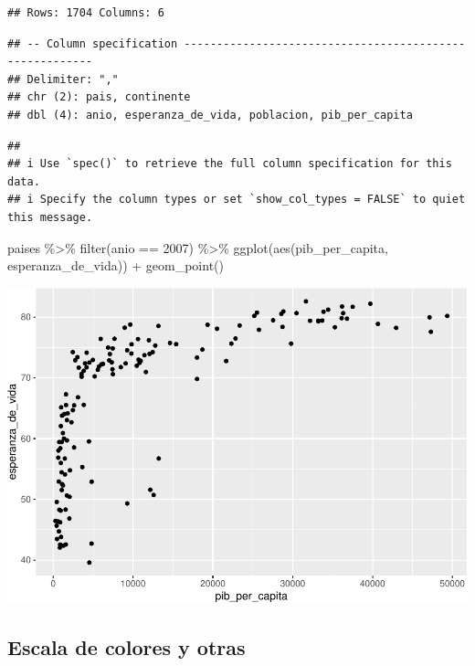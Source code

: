 \documentclass[
  openany]{book}
\newenvironment{Shaded}{\begin{snugshade}}{\end{snugshade}}
\newcommand{\DecValTok}[1]{\textcolor[rgb]{0.00,0.00,0.81}{#1}}
\newcommand{\FunctionTok}[1]{\textcolor[rgb]{0.00,0.00,0.00}{#1}}
\newcommand{\NormalTok}[1]{#1}
\newcommand{\SpecialCharTok}[1]{\textcolor[rgb]{0.00,0.00,0.00}{#1}}
\begin{document}
\begin{verbatim}
## Rows: 1704 Columns: 6
\end{verbatim}

\begin{verbatim}
## -- Column specification --------------------------------------------------------
## Delimiter: ","
## chr (2): pais, continente
## dbl (4): anio, esperanza_de_vida, poblacion, pib_per_capita
\end{verbatim}

\begin{verbatim}
## 
## i Use `spec()` to retrieve the full column specification for this data.
## i Specify the column types or set `show_col_types = FALSE` to quiet this message.
\end{verbatim}

\begin{Shaded}
\begin{Highlighting}[]
\NormalTok{paises }\SpecialCharTok{\%\textgreater{}\%} 
  \FunctionTok{filter}\NormalTok{(anio }\SpecialCharTok{==} \DecValTok{2007}\NormalTok{) }\SpecialCharTok{\%\textgreater{}\%} 
  \FunctionTok{ggplot}\NormalTok{(}\FunctionTok{aes}\NormalTok{(pib\_per\_capita, esperanza\_de\_vida)) }\SpecialCharTok{+}
  \FunctionTok{geom\_point}\NormalTok{()}
\end{Highlighting}
\end{Shaded}

\begin{center}\includegraphics[width=1\linewidth]{DT6_files/figure-latex/unnamed-chunk-129-1} \end{center}

\hypertarget{escala-de-colores-y-otras}{%
\subsection{Escala de colores y otras}\label{escala-de-colores-y-otras}}
\end{document}
